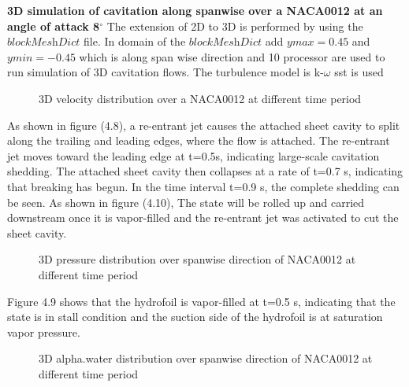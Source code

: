 \textbf{3D simulation of  cavitation along spanwise  over a  NACA0012 at an angle of attack 8$^{\circ}$}
The extension of 2D to 3D is performed by using the 
$\textit{blockMeshDict}$ file. In domain of the $\textit{blockMeshDict}$ add $ymax = 0.45$ and $ymin =-0.45$ 
which is along span wise direction and 10  processor are used to run simulation of  3D cavitation flows. The turbulence model is k-$\omega$ sst is used
\begin{figure}[H]
    \centering
    \qquad
   \qquad
      \caption{3D velocity distribution over a NACA0012 at different time period }
    \label{fig:fig16}
\end{figure}

As shown in figure (4.8), a re-entrant jet causes the attached sheet cavity to split along the trailing and leading edges, where the flow is attached. 
The re-entrant jet moves toward the leading edge at t=0.5s, indicating large-scale cavitation shedding.
The attached sheet cavity then collapses at a rate of t=0.7 s, indicating that breaking has begun.
In the time interval t=0.9 s, the complete shedding can be seen.
As shown in figure (4.10), The state will be rolled up and carried downstream once it is vapor-filled and the re-entrant jet was activated to cut the sheet cavity. 
 
\begin{figure}[H]
    \centering
    \qquad
   \qquad
      \caption{3D pressure distribution  over spanwise direction of NACA0012 at different time period }
    \label{fig:fig16}
\end{figure}
Figure 4.9 shows that the hydrofoil is vapor-filled at t=0.5 s, indicating that the state is in stall condition and the suction side of the hydrofoil is at saturation vapor pressure. 
\begin{figure}[H]
    \centering
    \qquad
   \qquad
      \caption{3D alpha.water distribution over spanwise direction  of NACA0012 at different time period }
    \label{fig:fig16}
\end{figure}


